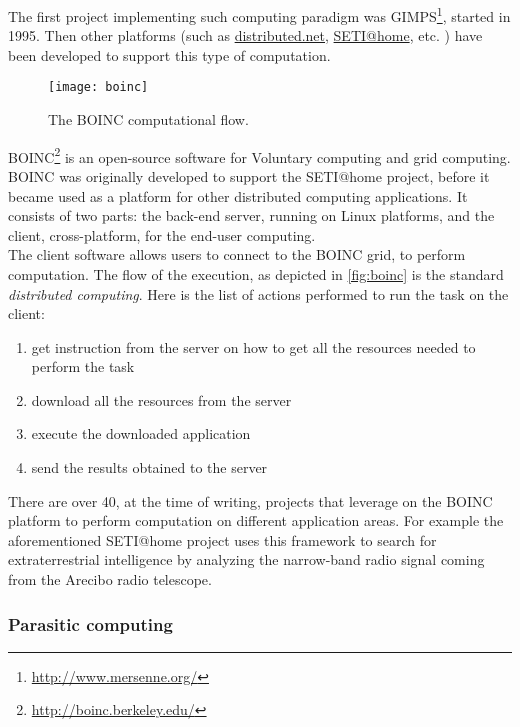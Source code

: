 The first project implementing such computing paradigm was
\ac{GIMPS}\footnote{\url{http://www.mersenne.org/}}, started in 1995. Then other
platforms (such as \href{http://www.distributed.net/}{distributed.net},
\href{http://setiathome.berkeley.edu/}{SETI@home}, etc. ) have been developed to
support this type of computation.

\begin{figure}[htb]
    \centering
    \texttt{[image: boinc]}
    \caption{The \acs{BOINC} computational flow.}
    \label{fig:boinc}
\end{figure}
\acf{BOINC}\footnote{\url{http://boinc.berkeley.edu/}} is an open-source software
for Voluntary computing and grid computing. \ac{BOINC} was originally developed
to support the \acf{SETI@home} project, before it became used as a platform for
other distributed computing applications. It consists of two parts: the back-end
server, running on Linux platforms, and the client, cross-platform, for the
end-user computing.\\

The client software allows users to connect to the \ac{BOINC} grid, to perform
computation. The flow of the execution, as depicted in \autoref{fig:boinc} is
the standard \emph{distributed computing}. Here is the list of actions performed
to run the task on the client:
\begin{enumerate}
    \item get instruction from the server on how to get all the resources needed
    to perform the task
    \item download all the resources from the server
    \item execute the downloaded application
    \item send the results obtained to the server
\end{enumerate}

There are over 40, at the time of writing, projects that leverage on
the \ac{BOINC} platform to perform computation on different application areas.
For example the aforementioned \ac{SETI@home} project uses this framework to
search for extraterrestrial intelligence by analyzing the narrow-band radio
signal coming from the Arecibo radio telescope.


\subsubsection{Parasitic computing}
\label{sec:bg:crowd:auto:parasitic}
